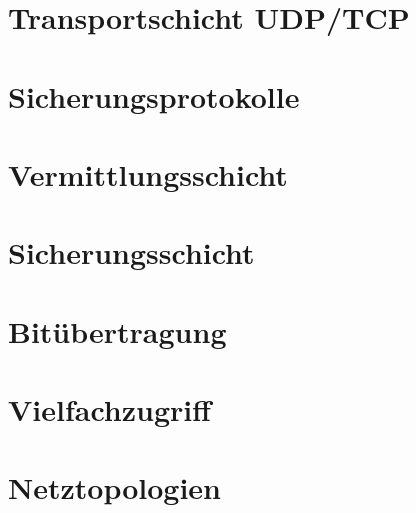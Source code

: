 \chapter{Transportschicht UDP/TCP}
%

\chapter{Sicherungsprotokolle}
%

\chapter{Vermittlungsschicht}
%

\chapter{Sicherungsschicht}
%

\chapter{Bitübertragung}
%

\chapter{Vielfachzugriff}
%

\chapter{Netztopologien}



